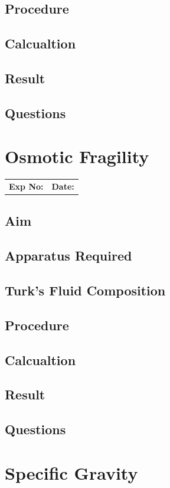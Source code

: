 \documentclass[a4paper,12pt]{book}
\begin{document}
	\section*{Procedure}
	\section*{Calcualtion}
	\section*{Result}
	\section*{Questions}


\chapter*{\centering Osmotic Fragility}
		\begin{tabular}{p{5in} p{1in}}
			\textbf{Exp No:}  & \textbf{Date:}\\
		\end{tabular}

	\section*{Aim}
	\section*{Apparatus Required}
	\section*{Turk's Fluid Composition}
	\section*{Procedure}
	\section*{Calcualtion}
	\section*{Result}
	\section*{Questions}

\chapter*{\centering Specific Gravity}
\end{document}
